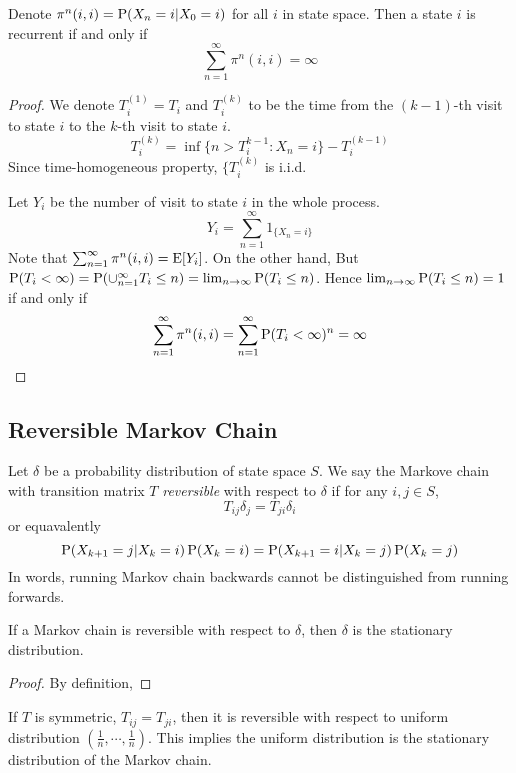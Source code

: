 \begin{theorem}
	Denote $\pi^n(i,i) = \P(X_n=i|X_0=i)$ for all $i$ in state space. Then a state $i$ is recurrent if and only if
	$$\sum_{n=1}^\infty \pi^n(i,i) = \infty$$
\end{theorem}
\begin{proof}
	We denote $T_i^{(1)} = T_i$ and $T_i^{(k)}$ to be the time from the $(k-1)$-th visit to state $i$ to the $k$-th visit to state $i$.
	$$T_i^{(k)} = \inf \{n>T_i^{k-1}: X_n = i\}-T_i^{(k-1)}$$
	Since time-homogeneous property, $\{T_i^{(k)}$ is i.i.d.
	
	Let $Y_i$ be the number of visit to state $i$ in the whole process.
	$$Y_i = \sum_{n=1}^\infty 1_{\{X_n = i\}}$$
	Note that $\sum_{n=1}^\infty \pi^n(i,i) = \E[Y_i]$. On the other hand,
	But $\P(T_i < \infty) = \P(\cup_{n=1}^\infty T_i \leq n) =  \lim_{n\to \infty} \P(T_i \leq n)$. Hence $\lim_{n\to \infty} \P(T_i \leq n) = 1 $ if and only if
	$$\sum_{n=1}^\infty \pi^n(i,i) = \sum_{n=1}^\infty \P(T_i < \infty)^n = \infty$$
\end{proof}

\subsection{Reversible Markov Chain}
Let $\delta$ be a probability distribution of state space $S$. We say the Markove chain with transition matrix $T$ \textit{reversible} with respect to $\delta$ if for any $i,j\in S$,
$$T_{ij} \delta_j = T_{ji} \delta_i$$  
or equavalently
$$\P(X_{k+1}=j|X_k=i) \P(X_k=i) = \P(X_{k+1}=i|X_k=j) \P(X_k=j)$$
In words, running Markov chain backwards cannot be distinguished from running forwards.

\begin{lemma}
	If a Markov chain is reversible with respect to $\delta$, then $\delta$ is the stationary distribution.
\end{lemma}
\begin{proof}
	By definition,
\end{proof}

If $T$ is symmetric, $T_{ij}=T_{ji}$, then it is reversible with respect to uniform distribution $(\frac{1}{n}, \cdots, \frac{1}{n})$. This implies the uniform distribution is the stationary distribution of the Markov chain.

